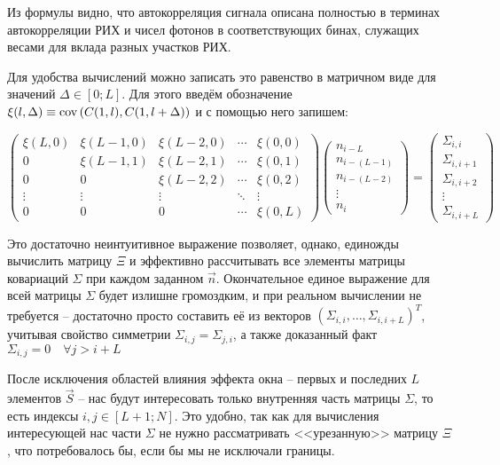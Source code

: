 Из формулы видно, что автокорреляция сигнала описана полностью в терминах автокорреляции РИХ и чисел фотонов в соответствующих бинах, служащих весами для вклада разных участков РИХ.

Для удобства вычислений можно записать это равенство в матричном виде для значений $\Delta \in \left[0; L\right]$. Для этого введём обозначение $\xi(l, \Delta) \equiv \mathrm{cov}\left(C(1, l), C(1, l + \Delta)\right)$ и с помощью него запишем:

\begin{equation}
	\begin{pmatrix} 
		\xi(L, 0) & \xi(L-1, 0) & \xi(L-2, 0) & \dotsm & \xi(0, 0) \\
		0    & \xi(L-1, 1) & \xi(L-2, 1) & \dotsm & \xi(0, 1) \\
		0    &      0      & \xi(L-2, 2) & \dotsm & \xi(0, 2) \\
		\vdots &   \vdots    &    \vdots   & \ddots &   \vdots  \\
		0    &      0      &      0      & \dotsm & \xi(0, L)
	\end{pmatrix}
	\begin{pmatrix} 
		n_{i-L} \\ n_{i-(L-1)} \\ n_{i-(L-2)} \\ \vdots \\ n_{i}
	\end{pmatrix}
	=
	\begin{pmatrix} 
		\Sigma_{i, i} \\
		\Sigma_{i, i+1} \\ 
		\Sigma_{i, i+2} \\ 
		\vdots \\ 
		\Sigma_{i, i+L}
	\end{pmatrix}
	\label{eq:Xi-matrix-for-Sigma-calculation}
\end{equation}

Это достаточно неинтуитивное выражение позволяет, однако, единожды вычислить матрицу $\Xi$ и эффективно рассчитывать все элементы матрицы ковариаций $\Sigma$ при каждом заданном $\vec{n}$. Окончательное единое выражение для всей матрицы $\Sigma$ будет излишне громоздким, и при реальном вычислении не требуется -- достаточно просто составить её из векторов $\left( \Sigma_{i, i}, \dots, \Sigma_{i, i+L} \right)^T$, учитывая свойство симметрии $\Sigma_{i, j} = \Sigma_{j, i}$, а также доказанный факт $\Sigma_{i, j} = 0 \quad \forall j > i + L$

После исключения областей влияния эффекта окна -- первых и последних $L$ элементов $\vec{S}$ -- нас будут интересовать только внутренняя часть матрицы $\Sigma$, то есть индексы $i, j \in [L + 1; N]$. Это удобно, так как для вычисления интересующей нас части $\Sigma$ не нужно рассматривать <<урезанную>> матрицу $\Xi$, что потребовалось бы, если бы мы не исключали границы.

